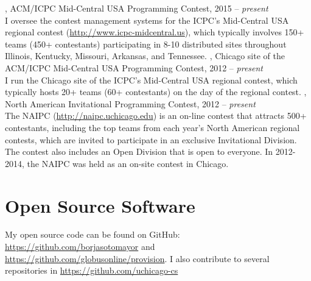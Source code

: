 \documentclass{resume}
\begin{document}
\begin{category}{}
, ACM/ICPC Mid-Central USA Programming Contest, 2015 -- \emph{present}\\
I oversee the contest management systems for the ICPC's Mid-Central USA regional contest (\url{http://www.icpc-midcentral.us}), which typically involves 150+ teams (450+ contestants) participating in 8-10 distributed sites throughout Illinois, Kentucky, Missouri, Arkansas, and Tennessee.
, Chicago site of the ACM/ICPC Mid-Central USA Programming Contest, 2012 -- \emph{present}\\
I run the Chicago site of the ICPC's Mid-Central USA regional contest, which typically hosts 20+ teams (60+ contestants) on the day of the regional contest.
, North American Invitational Programming Contest, 2012 -- \emph{present}\\
The NAIPC (\url{http://naipc.uchicago.edu}) is an on-line contest that attracts 500+ contestants, including the top teams from each year's North American regional contests, which are invited to participate in an exclusive Invitational Division. The contest also includes an Open Division that is open to everyone. In 2012-2014, the NAIPC was held as an on-site contest in Chicago.
\end{category}


\section*{\hspace{-1cm}Open Source Software}

My open source code can be found on GitHub: \url{https://github.com/borjasotomayor} and \url{https://github.com/globusonline/provision}. I also contribute to several repositories in \url{https://github.com/uchicago-cs}
\end{document}
